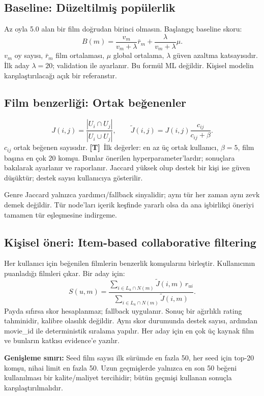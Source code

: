 \documentclass[11pt,a4paper]{article}
\newcommand{\design}{\textbf{[T]}}
\begin{document}
\subsection{Baseline: Düzeltilmiş popülerlik}
Az oyla 5.0 alan bir film doğrudan birinci olmasın. Başlangıç baseline skoru:
\[
B(m)=\frac{v_m}{v_m+\lambda}\bar r_m+
\frac{\lambda}{v_m+\lambda}\mu.
\]
$v_m$ oy sayısı, $\bar r_m$ film ortalaması, $\mu$ global ortalama, $\lambda$ güven azaltma katsayısıdır. İlk aday $\lambda=20$; validation ile ayarlanır. Bu formül ML değildir. Kişisel modelin karşılaştırılacağı açık bir referanstır.

\subsection{Film benzerliği: Ortak beğenenler}
\[
J(i,j)=\frac{|U_i\cap U_j|}{|U_i\cup U_j|},\qquad
\widetilde J(i,j)=J(i,j)\frac{c_{ij}}{c_{ij}+\beta}.
\]
$c_{ij}$ ortak beğenen sayısıdır. \design\ İlk değerler: en az üç ortak kullanıcı, $\beta=5$, film başına en çok 20 komşu. Bunlar önerilen hyperparameter'lardır; sonuçlara bakılarak ayarlanır ve raporlanır. Jaccard yüksek olup destek bir kişi ise güven düşüktür; destek sayısı kullanıcıya gösterilir.

Genre Jaccard yalnızca yardımcı/fallback sinyalidir; aynı tür her zaman aynı zevk demek değildir. Tür node'ları içerik keşfinde yararlı olsa da ana işbirlikçi öneriyi tamamen tür eşleşmesine indirgeme.

\subsection{Kişisel öneri: Item-based collaborative filtering}
Her kullanıcı için beğenilen filmlerin benzerlik komşularını birleştir. Kullanıcının puanladığı filmleri çıkar. Bir aday için:
\[
S(u,m)=\frac{\sum_{i\in L_u\cap N(m)}\widetilde J(i,m)\,r_{ui}}
{\sum_{i\in L_u\cap N(m)}\widetilde J(i,m)}.
\]
Payda sıfırsa skor hesaplanmaz; fallback uygulanır. Sonuç bir ağırlıklı rating tahminidir, kalibre olasılık değildir. Aynı skor durumunda destek sayısı, ardından movie\_id ile deterministik sıralama yapılır. Her aday için en çok üç kaynak film ve bunların katkısı evidence'e yazılır.

\textbf{Genişleme sınırı:} Seed film sayısı ilk sürümde en fazla 50, her seed için top-20 komşu, nihai limit en fazla 50. Uzun geçmişlerde yalnızca en son 50 beğeni kullanılması bir kalite/maliyet tercihidir; bütün geçmişi kullanan sonuçla karşılaştırılmalıdır.
\end{document}
